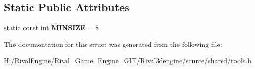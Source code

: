 \subsection*{Static Public Attributes}
\begin{DoxyCompactItemize}
\item 
\mbox{\label{structvector_a698115fea16e441abf3ea84dd8376d3c}} 
static const int {\bfseries M\+I\+N\+S\+I\+ZE} = 8
\end{DoxyCompactItemize}


The documentation for this struct was generated from the following file\+:\begin{DoxyCompactItemize}
\item 
H\+:/\+Rival\+Engine/\+Rival\+\_\+\+Game\+\_\+\+Engine\+\_\+\+G\+I\+T/\+Rival3dengine/source/shared/tools.\+h\end{DoxyCompactItemize}
